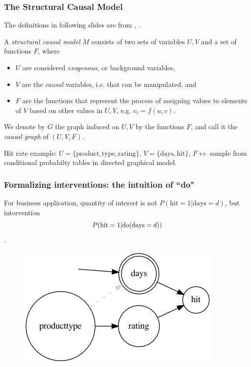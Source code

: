 \begin{frame}
    \frametitle{The Structural Causal Model}
    The definitions in following slides are from \cite{pearl2007mathematics}, \cite{pearl2016causal}.
\begin{definition}
    A \emph{structural causal model} $M$ consists of two sets of variables $U, V$ and a set of functions $F$, where 
    
    \begin{itemize}
        \item $U$ are considered \emph{exogenous}, or background variables, 
        \item $V$ are the \emph{causal} variables, i.e. that can be manipulated, and
        \item $F$ are the functions that represent the process of assigning values to elements of $V$ based on other values in $U, V$, e.g. $v_i = f(u, v)$.
    \end{itemize}

    We denote by $G$ the graph induced on $U, V$ by the functions $F$, and call it the \emph{causal graph} of $(U, V, F)$.\newline
\end{definition}

Hit rate example: $U = \{\textrm{product\_type}, \textrm{rating}\}$, $V= \{\textrm{days}, \textrm{hit}\}$, $F\leftrightarrow$ sample from conditional probabilty tables in directed graphical model.
\end{frame}


\begin{frame}
    \frametitle{Formalizing interventions: the intuition of ``do"}
    For business application, quantity of interest is not $P(\textrm{hit}=1 | \textrm{days}=d)$, but intervention $$P(\textrm{hit}=1 | \mathrm{do}(\textrm{days}=d))$$.\newline
    \begin{figure}[ht]
\includegraphics[height=0.4\textwidth]{graphics/do_days}
    \end{figure}
\end{frame}


